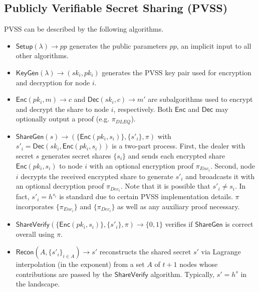 \documentclass[conference]{IEEEtran}
\theoremstyle{definition}
\theoremstyle{remark}
\begin{document}
\subsection{Publicly Verifiable Secret Sharing (PVSS)}
\label{appendix:pvss}
PVSS can be described by the following algorithms.
\begin{itemize}
    \item $\mathsf{Setup}(\lambda) \rightarrow pp$ generates the public parameters $pp$, an implicit input to all other algorithms.
    \item $\mathsf{KeyGen}(\lambda) \rightarrow (sk_i, pk_i)$ generates the PVSS key pair used for encryption and decryption for node $i$.
    \item $\mathsf{Enc}(pk_i, m) \rightarrow c$ and $\mathsf{Dec}(sk_i, c) \rightarrow m'$ are subalgorithms used to encrypt and decrypt the share to node $i$, respectively. Both $\mathsf{Enc}$ and $\mathsf{Dec}$ may optionally output a proof (e.g. $\pi_{DLEQ}$).
    \item $\mathsf{ShareGen}(s) \rightarrow (\{\mathsf{Enc}(pk_i, s_i)\}, \{s'_i\}, \pi)$ with $s'_i = \mathsf{Dec}(sk_i, \mathsf{Enc}(pk_i, s_i))$ is a two-part process. First, the dealer with secret $s$ generates secret shares $\{s_i\}$ and sends each encrypted share $\mathsf{Enc}(pk_i, s_i)$ to node $i$ with an optional encryption proof $\pi_{Enc_{i}}$. Second, node $i$ decrypts the received encrypted share to generate $s'_i$ and broadcasts it with an optional decryption proof $\pi_{Dec_{i}}$. Note that it is possible that $s'_i \neq s_i$. In fact, $s'_i = h^{s_i}$ is standard due to certain PVSS implementation details. $\pi$ incorporates $\{\pi_{Enc_{i}}\}$ and $\{\pi_{Dec_{i}}\}$ as well as any auxiliary proof necessary.
    \item $\mathsf{ShareVerify}(\{\mathsf{Enc}(pk_i, s_i)\}, \{s'_i\}, \pi) \rightarrow \{0, 1\}$ verifies if $\mathsf{ShareGen}$ is correct overall using $\pi$.
    \item $\mathsf{Recon}(A, \{s'_i\}_{i \in A}) \rightarrow s'$ reconstructs the shared secret $s'$ via Lagrange interpolation (in the exponent) from a set $A$ of $t + 1$ nodes whose contributions are passed by the $\mathsf{ShareVerify}$ algorithm. Typically, $s' = h^s$ in the landscape.
\end{itemize}

\end{document}
